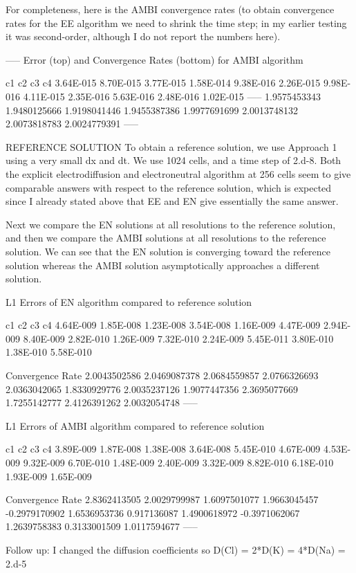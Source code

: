 \documentclass[final]{siamltex}
\begin{document}
For completeness, here is the AMBI convergence rates (to obtain convergence 
rates for the EE algorithm we need to shrink the time step; in my earlier 
testing it was second-order, although I do not report the numbers here).

-----
Error (top) and Convergence Rates (bottom) for AMBI algorithm

c1		c2		c3		c4
3.64E-015	8.70E-015	3.77E-015	1.58E-014
9.38E-016	2.26E-015	9.98E-016	4.11E-015
2.35E-016	5.63E-016	2.48E-016	1.02E-015
-----			
1.9575453343	1.9480125666	1.9198041446	1.9455387386
1.9977691699	2.0013748132	2.0073818783	2.0024779391
-----

REFERENCE SOLUTION
To obtain a reference solution, we use Approach 1 using a very small dx and dt.
We use 1024 cells, and a time step of 2.d-8.  Both the explicit electrodiffusion
and electroneutral algorithm at 256 cells seem to give comparable answers with
respect to the reference solution, which is expected since I already stated above
that EE and EN give essentially the same answer.

Next we compare the EN solutions at all resolutions to the reference solution, and then
we compare the AMBI solutions at all resolutions to the reference solution.
We can see that the EN solution is converging toward the reference solution whereas the
AMBI solution asymptotically approaches a different solution.

L1 Errors of EN algorithm compared to reference solution

c1		c2		c3		c4
4.64E-009	1.85E-008	1.23E-008	3.54E-008
1.16E-009	4.47E-009	2.94E-009	8.40E-009
2.82E-010	1.26E-009	7.32E-010	2.24E-009
5.45E-011	3.80E-010	1.38E-010	5.58E-010
			
Convergence Rate			
2.0043502586	2.0469087378	2.0684559857	2.0766326693
2.0363042065	1.8330929776	2.0035237126	1.9077447356
2.3695077669	1.7255142777	2.4126391262	2.0032054748
-----

L1 Errors of AMBI algorithm compared to reference solution

c1		c2		c3		c4
3.89E-009	1.87E-008	1.38E-008	3.64E-008
5.45E-010	4.67E-009	4.53E-009	9.32E-009
6.70E-010	1.48E-009	2.40E-009	3.32E-009
8.82E-010	6.18E-010	1.93E-009	1.65E-009
			
Convergence Rate		
2.8362413505	2.0029799987	1.6097501077	1.9663045457
-0.2979170902	1.6536953736	0.917136087	1.4900618972
-0.3971062067	1.2639758383	0.3133001509	1.0117594677
-----

Follow up: I changed the diffusion coefficients so D(Cl) = 2*D(K) = 4*D(Na) = 2.d-5
\end{document}
